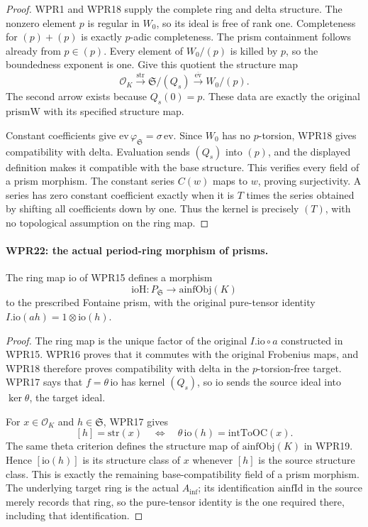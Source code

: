 \begin{proof}
WPR1 and WPR18 supply the complete ring and delta structure.
The nonzero element $p$ is regular in $W_0$, so its ideal is
free of rank one. Completeness for $(p)+(p)$ is exactly
$p$-adic completeness. The prism containment follows already
from $p\in(p)$. Every element of $W_0/(p)$ is killed by $p$,
so the boundedness exponent is one. Give this quotient the
structure map
\[
 \mathcal O_K\xrightarrow{\mathrm{str}}
 \mathfrak S/(Q_s)\xrightarrow{\overline{\mathrm{ev}}}W_0/(p).
\]
The second arrow exists because $Q_s(0)=p$. These data are
exactly the original $\mathrm{prismW}$ with its specified
structure map.

Constant coefficients give
$\mathrm{ev}\,\varphi_{\mathfrak S}=\sigma\,\mathrm{ev}$.
Since $W_0$ has no $p$-torsion, WPR18 gives compatibility with
delta. Evaluation sends $(Q_s)$ into $(p)$, and the displayed
definition makes it compatible with the base structure. This
verifies every field of a prism morphism. The constant series
$C(w)$ maps to $w$, proving surjectivity. A series has zero
constant coefficient exactly when it is $T$ times the series
obtained by shifting all coefficients down by one. Thus the
kernel is precisely $(T)$, with no topological assumption on
the ring map.
\end{proof}

\paragraph{WPR22: the actual period-ring morphism of prisms.}
\label{claim:WPR22}
The ring map $\mathrm{io}$ of WPR15 defines a morphism
\[
 \mathrm{ioH}:P_{\mathfrak S}\longrightarrow\mathrm{ainfObj}(K)
 \tag{WPR.27}
\]
to the prescribed Fontaine prism, with the original pure-tensor
identity $I.\mathrm{io}(a h)=1\otimes\mathrm{io}(h)$.

\begin{proof}
The ring map is the unique factor of the original
$I.\mathrm{io}\circ a$ constructed in WPR15. WPR16 proves
that it commutes with the original Frobenius maps, and WPR18
therefore proves compatibility with delta in the $p$-torsion-free
target. WPR17 says that $f=\theta\,\mathrm{io}$ has kernel
$(Q_s)$, so $\mathrm{io}$ sends the source ideal into
$\ker\theta$, the target ideal.

For $x\in\mathcal O_K$ and $h\in\mathfrak S$, WPR17 gives
\[
 [h]=\mathrm{str}(x)
 \quad\Longleftrightarrow\quad
 \theta\,\mathrm{io}(h)=\mathrm{intToOC}(x).
\]
The same theta criterion defines the structure map of
$\mathrm{ainfObj}(K)$ in WPR19. Hence $[\mathrm{io}(h)]$
is its structure class of $x$ whenever $[h]$ is the source
structure class. This is exactly the remaining base-compatibility
field of a prism morphism. The underlying target ring is the
actual $A_{\mathrm{inf}}$; its identification $\mathrm{ainfId}$ in the
source merely records that ring, so the pure-tensor identity is
the one required there, including that identification.
\end{proof}

